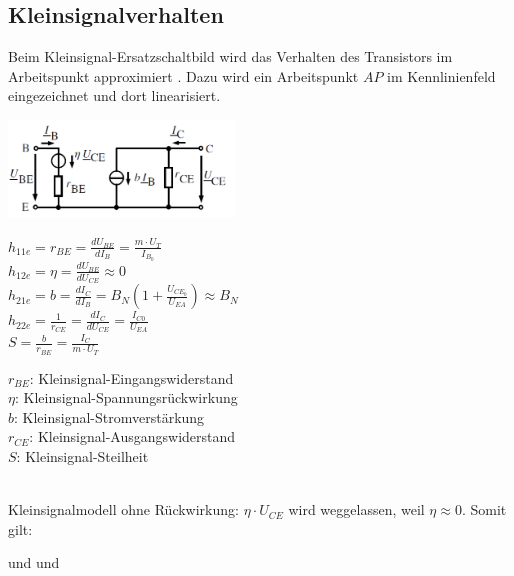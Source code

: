 	\subsection{Kleinsignalverhalten}
		Beim Kleinsignal-Ersatzschaltbild wird das Verhalten des Transistors im Arbeitspunkt
		approximiert . Dazu wird ein Arbeitspunkt $AP$ im Kennlinienfeld eingezeichnet
		und dort linearisiert. \\
		\begin{minipage}[c]{6cm}
			\includegraphics[width=6cm]{images/bip-kleinsignal}
		\end{minipage}
		\begin{minipage}[c]{6cm}
			$h_{11e} = r_{BE} = \frac{dU_{BE}}{dI_{B}} = \frac{m \cdot U_T}{I_{B_0}}$ \\
			$h_{12e} = \eta = \frac{dU_{BE}}{dU_{CE}} \approx 0$ \\
			$h_{21e} = b = \frac{dI_C}{dI_B} = B_N(1+\frac{U_{CE_0}}{U_{EA}}) \approx B_N$ \\
			$h_{22e} = \frac{1}{r_{CE}} = \frac{dI_C}{dU_{CE}} = \frac{I_{C0}}{U_{EA}}$ \\
			$S = \frac{b}{r_{BE}} = \frac{I_C}{m \cdot U_T}$
		\end{minipage}
		\begin{minipage}[c]{6cm}
			$r_{BE}$: Kleinsignal-Eingangswiderstand \\
			$\eta$: Kleinsignal-Spannungsrückwirkung \\
			$b$: Kleinsignal-Stromverstärkung \\
			$r_{CE}$: Kleinsignal-Ausgangswiderstand \\
			$S$: Kleinsignal-Steilheit
		\end{minipage} \\
		Kleinsignalmodell ohne Rückwirkung: $\eta \cdot U_{CE}$ wird weggelassen, weil 
		$\eta \approx 0$. Somit gilt: \\
		\begin{center}
			 \hspace{1cm} und \hspace{1cm}
			 \hspace{1cm} und \hspace{1cm}
		\end{center}
		
